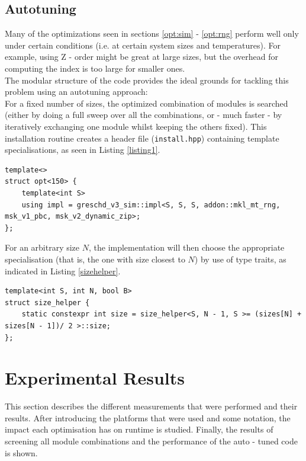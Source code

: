 \documentclass[letterpaper]{article}
\begin{document}
\subsection{Autotuning}
Many of the optimizations seen in sections \ref{opt:sim} - \ref{opt:rng} perform well only under certain conditions (i.e. at certain system sizes and temperatures). For example, using Z - order might be great at large sizes, but the overhead for computing the index is too large for smaller ones. \\
The modular structure of the code provides the ideal grounds for tackling this problem using an autotuning approach:\\
For a fixed number of sizes, the optimized combination of modules is searched (either by doing a full sweep over all the combinations, or - much faster - by iteratively exchanging one module whilst keeping the others fixed). This installation routine creates a header file (\texttt{install.hpp}) containing template specialisations, as seen in Listing \ref{listing1}.
\begin{lstlisting}[caption = {example for a template specialisation}, label = listing1]
template<>
struct opt<150> {
    template<int S>
    using impl = greschd_v3_sim::impl<S, S, S, addon::mkl_mt_rng, msk_v1_pbc, msk_v2_dynamic_zip>; 
};
\end{lstlisting}
For an arbitrary size $N$, the implementation will then choose the appropriate specialisation (that is, the one with size closest to $N$) by use of type traits, as indicated in Listing \ref{sizehelper}.
\begin{lstlisting}[label = sizehelper, caption = {size\_helper, part of the type traits}]
template<int S, int N, bool B>
struct size_helper {
    static constexpr int size = size_helper<S, N - 1, S >= (sizes[N] + sizes[N - 1])/ 2 >::size;
};
\end{lstlisting}
\section{Experimental Results}\label{sec:exp}
This section describes the different measurements that were performed and their results. After introducing the platforms that were used and some notation, the impact each optimisation has on runtime is studied. Finally, the results of screening all module combinations and the performance of the auto - tuned code is shown.
\end{document}
